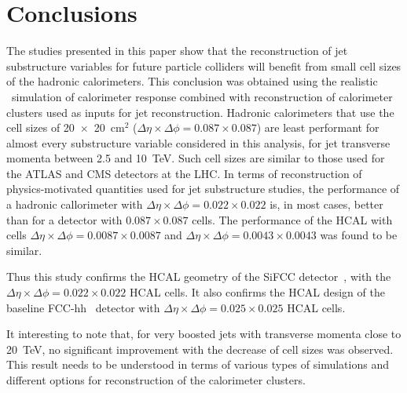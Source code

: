 \section{Conclusions}
The studies presented in this paper show that the reconstruction of jet substructure 
variables for future particle colliders will benefit from small cell sizes of the hadronic calorimeters. 
This conclusion was obtained using the realistic \GEANTfour\ simulation of calorimeter response combined with reconstruction of 
calorimeter clusters used as inputs for jet reconstruction. 
Hadronic calorimeters that use the cell sizes of 20~$\times $~20~cm$^2$ ($\Delta \eta \times \Delta \phi = 0.087\times 0.087$) 
are least performant for almost every 
substructure variable considered in this analysis, for jet transverse momenta between 2.5 and 10~TeV. 
Such cell sizes are similar to 
those used for the ATLAS and CMS detectors at the LHC. 
In terms of reconstruction of physics-motivated quantities  
used for jet substructure studies, the  performance 
of a  hadronic callorimeter  with 
$\Delta \eta \times \Delta \phi = 0.022\times0.022$ is, in most cases,
better than for a detector with  $0.087\times 0.087$ cells.
The performance of the HCAL with cells $\Delta \eta \times \Delta \phi = 0.0087\times 0.0087$ and
$\Delta \eta \times \Delta \phi = 0.0043\times 0.0043$ was found to be similar.

Thus this study confirms the  HCAL geometry of the SiFCC detector~\cite{Chekanov:2016ppq},
with the $\Delta \eta \times \Delta \phi = 0.022\times0.022$ HCAL cells.
It also confirms the HCAL design of the baseline FCC-hh~\cite{fcc1,fcc2} detector with
$\Delta \eta \times \Delta \phi = 0.025\times0.025$ HCAL cells.

It interesting to note that,  for very boosted jets with transverse momenta close to 20~TeV, no significant improvement with the 
decrease of cell sizes was observed. This result needs to be understood in terms of various types of simulations and 
different options for reconstruction of the calorimeter clusters.
